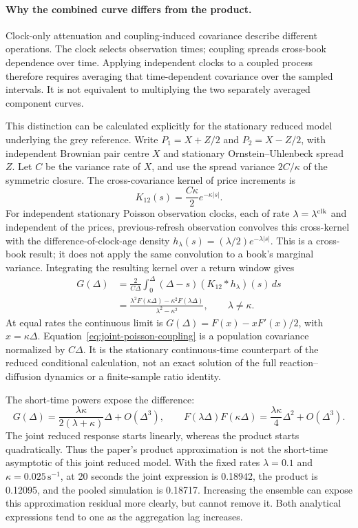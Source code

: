 \paragraph{Why the combined curve differs from the product.}
Clock-only attenuation and coupling-induced covariance describe different operations. The clock selects observation times; coupling spreads cross-book dependence over time. Applying independent clocks to a coupled process therefore requires averaging that time-dependent covariance over the sampled intervals. It is not equivalent to multiplying the two separately averaged component curves.

This distinction can be calculated explicitly for the stationary reduced model underlying the grey reference. Write $P_1=X+Z/2$ and $P_2=X-Z/2$, with independent Brownian pair centre $X$ and stationary Ornstein--Uhlenbeck spread $Z$. Let $C$ be the variance rate of $X$, and use the spread variance $2C/\kappa$ of the symmetric closure. The cross-covariance kernel of price increments is
\begin{equation}
K_{12}(s)=\frac{C\kappa}{2}e^{-\kappa|s|}.
\end{equation}
For independent stationary Poisson observation clocks, each of rate $\lambda=\lambda^{\rm clk}$ and independent of the prices, previous-refresh observation convolves this cross-kernel with the difference-of-clock-age density $h_\lambda(s)=(\lambda/2)e^{-\lambda|s|}$. This is a cross-book result; it does not apply the same convolution to a book's marginal variance. Integrating the resulting kernel over a return window gives
\begin{align}
G(\Delta)
&=\frac{2}{C\Delta}\int_0^\Delta(\Delta-s)
       (K_{12}*h_\lambda)(s)\,ds \\
&=\frac{\lambda^2F(\kappa\Delta)-\kappa^2F(\lambda\Delta)}
        {\lambda^2-\kappa^2},\qquad \lambda\ne\kappa.
\label{eq:joint-poisson-coupling}
\end{align}
At equal rates the continuous limit is $G(\Delta)=F(x)-xF'(x)/2$, with $x=\kappa\Delta$. Equation~\eqref{eq:joint-poisson-coupling} is a population covariance normalized by $C\Delta$. It is the stationary continuous-time counterpart of the reduced conditional calculation, not an exact solution of the full reaction--diffusion dynamics or a finite-sample ratio identity.

The short-time powers expose the difference:
\begin{equation}
G(\Delta)=\frac{\lambda\kappa}{2(\lambda+\kappa)}\Delta+O(\Delta^3),
\qquad
F(\lambda\Delta)F(\kappa\Delta)
=\frac{\lambda\kappa}{4}\Delta^2+O(\Delta^3).
\label{eq:joint-short-time}
\end{equation}
The joint reduced response starts linearly, whereas the product starts quadratically. Thus the paper's product approximation is not the short-time asymptotic of this joint reduced model. With the fixed rates $\lambda=0.1$ and $\kappa=0.025\,\mathrm{s}^{-1}$, at 20 seconds the joint expression is 0.18942, the product is 0.12095, and the pooled simulation is 0.18717. Increasing the ensemble can expose this approximation residual more clearly, but cannot remove it. Both analytical expressions tend to one as the aggregation lag increases.

